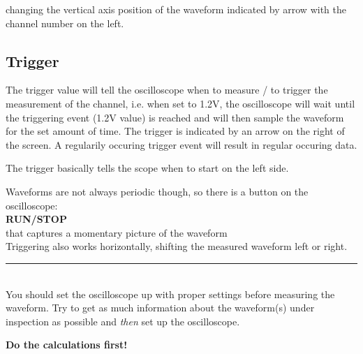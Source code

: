 \documentclass[a4paper, 12pt]{article}
\newcommand{\holine}{
  \noindent\rule{\textwidth}{0.618pt}\\[0.021286\paperheight]
}
\newcommand{\notebox}[1]{

 \begin{center}
  \begin{tcolorbox}[]
   #1 
  \end{tcolorbox}
 
 \end{center} 
 
}
\begin{document}
changing the vertical axis position of the waveform
indicated by arrow with the channel number on the left.

\subsection*{Trigger}
The trigger value will tell the oscilloscope when to measure / to trigger the
measurement of the channel, i.e. when set to 1.2V, the oscilloscope will wait
until the triggering event (1.2V value) is reached and will then sample the
waveform for the set amount of time. The trigger is indicated by an arrow on the
right of the screen.
A regularily occuring trigger event will result in regular occuring data.

\notebox{

  The trigger basically tells the scope when to start on the left side.
  
}

Waveforms are not always periodic though, so there is a button on the
oscilloscope:\\
\textbf{ RUN/STOP }\\
that captures a momentary picture of the waveform \\

Triggering also works horizontally, shifting the measured waveform left or right.

\holine

You should set the oscilloscope up with proper settings before measuring the
waveform. Try to get as much information about the waveform(s) under inspection
as possible and \emph{then} set up the oscilloscope.

\notebox{\textbf{Do the calculations first!}}

\pagebreak
\end{document}
